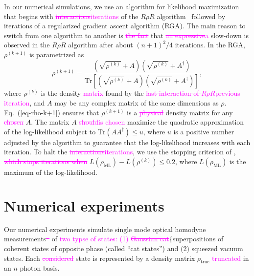 \documentclass[
reprint,
superscriptaddress,
showpacs,
amsmath,
amssymb,
aps,
pra,
longbibliography
]{revtex4-1}
\providecommand{\aucmnt}[1]{#1}
\providecommand{\editcolor}[2]{\textcolor{#1}{#2}}
\providecommand{\aucmnt}[1]{}
\providecommand{\editcolor}[2]{#2}
\newcommand{\SG}[1]{\editcolor{magenta}{#1}}
\newcommand{\SGs}[1]{\aucmnt{\editcolor{magenta}{\sout{#1}}}}
\begin{document}
In our numerical simulations, we use an algorithm for likelihood
maximization that begins with \SGs{interactions}\SG{iterations} of the
$R\rho R$ algorithm~\cite{Rehacek2007} followed by iterations of a
regularized gradient ascent algorithm (RGA). The main reason to switch
from one algorithm to another is \SGs{the fact} that \SGs{an
  expressive}\SG{a} slow-down is observed in the $R\rho R$ algorithm
after about $(n+1)^2/4$ iterations. In the RGA, $\rho^{(k+1)}$ is
parametrized as
\begin{equation}
  \rho^{(k+1)}=\frac{\left(\sqrt{\rho^{(k)}}+A\right)\left(\sqrt{\rho^{(k)}}+A^{\dagger}\right)}{\mathrm{Tr}\left[\left(\sqrt{\rho^{(k)}}+A\right)\left(\sqrt{\rho^{(k)}}+A^{\dagger}\right)\right]},
  \label{eq-rho-k+1}
\end{equation}
where $\rho^{(k)}$ is the density \SG{matrix} found by the \SGs{last
  interaction of $R \rho R$}\SG{previous iteration}, and $A$ may be
any complex matrix of the same dimensions as
$\rho$. Eq.~(\ref{eq-rho-k+1}) ensures that $\rho^{(k+1)}$ is a
\SGs{physical} density matrix for any \SGs{chosen} $A$. The matrix $A$
\SGs{should}\SG{is chosen} maximize the quadratic approximation of the
log-likelihood subject to $\text{Tr}(AA^{\dagger})\leq u$, where $u$
is a positive number adjusted by the algorithm to guarantee that the
log-likelihood increases with each iteration. To halt the
\SGs{interactions}\SG{iterations}, we use the stopping criterion of
\cite{Glancy2012}, \SGs{which stops iterations when}
$L(\rho_{\text{ML}})-L(\rho^{(k)})\leq 0.2$, where
$L(\rho_{\text{ML}})$ is the maximum of the log-likelihood.



\section{Numerical experiments}
\label{numerical-experiments}
Our numerical experiments simulate single mode optical homodyne
measurements\SGs{~\cite{Lvovsky2009}} of \SG{two typse of states: (1)}
\SGs{Gaussian cat}\{superpositions of coherent states of opposite
phase (called ``cat states'') and (2) squeezed vacuum states.  Each
\SGs{considered} state is represented by a density matrix
$\rho_{\mathrm{true}}$ \SG{truncated} in an $n$ photon basis.
\end{document}
